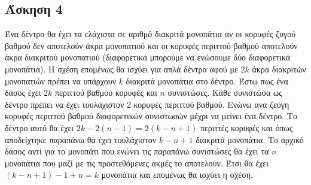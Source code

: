 \newpage\subsection*{Άσκηση 4}
Ένα δέντρο θα έχει τα ελάχιστα σε αριθμό διακριτά μονοπάτια
αν οι κορυφές ζυγού βαθμού δεν αποτελούν άκρα μονοπατιού και οι
κορυφές περιττού βαθμού αποτελούν άκρα διακριτού μονοπατιού (διαφορετικά μπορούμε να ενώσουμε δύο διαφορετικά μονοπάτια).
Η σχέση επομένως θα ισχύει για απλά δέντρα αφού με $2k$ άκρα διακριτών μονοπατιών πρέπει να υπάρχουν $k$ διακριτά μονοπάτια στο δέντρο.
Έστω πως ένα δάσος έχει $2k$ περιττού βαθμού κορυφές και $n$ συνιστώσες. Κάθε συνιστώσα ως δέντρο πρέπει να έχει τουλάχιστον 2 κορυφές περιττού βαθμού.
Ενώνω ανα ζεύγη κορυφές περιττού βαθμού διαφορετικών συνιστωσών μέχρι να μείνει ένα δέντρο. Το δέντρο αυτό θα έχει $2k - 2(n-1) = 2(k-n+1)$ περιττές 
κορυφές και όπως αποδείχτηκε παραπάνω θα έχει τουλάχιστον $k-n+1$ διακριτά μονοπάτια. Το αρχικό δάσος αντί για το μονοπάτι που ενώνει τις παραπάνω συνιστώσες
θα έχει τα $n$ μονοπάτια που μαζί με τις προστεθόμενες ακμές το αποτελούν. Έτσι θα έχει $(k-n+1) - 1 + n = k$ μονοπάτια και επομένως θα ισχύει η σχέση.
